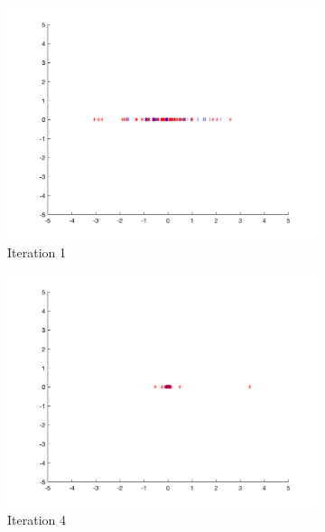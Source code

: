 \begin{figure}
  \begin{subfigure}[b]{0.4\textwidth}
    \includegraphics[width=\textwidth]{img/smpl/circ/loa-iter-1}
    \caption{Iteration 1}
    \label{fig:s1-iter-0}
  \end{subfigure}
  \begin{subfigure}[b]{0.4\textwidth}
    \includegraphics[width=\textwidth]{img/smpl/circ/loa-iter-4}
    \caption{Iteration 4}
    \label{fig:s1-iter-1}
  \end{subfigure}
  \begin{subfigure}[b]{0.4\textwidth}

\end{subfigure}
\end{figure}
